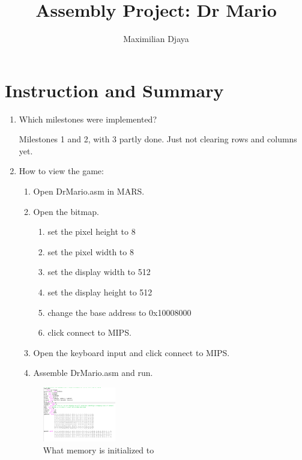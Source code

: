 \documentclass{article}
\title{Assembly Project: Dr Mario}
\author{Maximilian Djaya}
\begin{document}
\maketitle

\section{Instruction and Summary}

\begin{enumerate}

    \item Which milestones were implemented?
    
    Milestones 1 and 2, with 3 partly done. Just not clearing rows and columns yet.
    \item How to view the game:
    
    \begin{enumerate}

    \item Open DrMario.asm in MARS.
    \item Open the bitmap.
    \begin{enumerate}
        \item set the pixel height to 8
        \item set the pixel width to 8
        \item set the display width to 512
        \item set the display height to 512
        \item change the base address to 0x10008000
        \item click connect to MIPS.
    \end{enumerate}
    \item Open the keyboard input and click connect to MIPS.
    \item Assemble DrMario.asm and run.


    \end{enumerate}

    

\begin{figure}[ht!]
    \centering
    \includegraphics[width=0.3\textwidth]{memory.png}
    \caption{What memory is initialized to}
    \label{Instructions}
\end{figure}


\end{enumerate}
\end{document}
